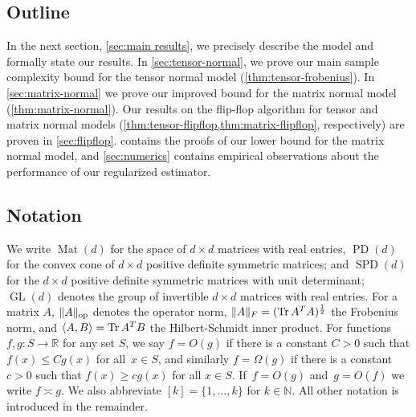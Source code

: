 \documentclass[aos]{imsart}
\theoremstyle{definition}
\numberwithin{equation}{section}
\DeclareMathOperator{\op}{op}
\DeclareMathOperator{\Mat}{Mat}
\DeclareMathOperator{\GL}{GL}
\DeclareMathOperator{\tr}{Tr}
\DeclareMathOperator{\PD}{PD}
\DeclareMathOperator{\SSPD}{SPD}
\DeclarePairedDelimiter{\abs}{\lvert}{\rvert}
\DeclarePairedDelimiter{\norm}{\lVert}{\rVert}
\newcommand{\R}{{\mathbb{R}}}
\newcommand{\N}{{\mathbb{N}}}
\newcommand{\MW}[1]{{\color{red}[MW: #1]}}
\newcommand{\MW}[1]{{}}
\begin{document}
\subsection{Outline}
In the next section, \cref{sec:main results}, we precisely describe the model and formally state our results.
In \cref{sec:tensor-normal}, we prove our main sample complexity bound for the tensor normal model (\cref{thm:tensor-frobenius}).
In \cref{sec:matrix-normal} we prove our improved bound for the matrix normal model (\cref{thm:matrix-normal}).
Our results on the flip-flop algorithm for tensor and matrix normal models (\cref{thm:tensor-flipflop,thm:matrix-flipflop}, respectively) are proven in \cref{sec:flipflop}.
 contains the proofs of our lower bound for the matrix normal model, and \cref{sec:numerics} contains empirical observations about the performance of our regularized estimator.

\subsection{Notation}
We write $\Mat(d)$ for the space of $d\times d$ matrices with real entries, $\PD(d)$ for the convex cone of $d\times d$ positive definite symmetric matrices; and $\SSPD(d)$ for the $d\times d$ positive definite symmetric matrices with unit determinant; $\GL(d)$ denotes the group of invertible $d\times d$ matrices with real entries.
For a matrix $A$, $\norm{A}_{\op}$ denotes the operator norm, $\norm{A}_F = (\tr A^T A)^{\frac12}$ the Frobenius norm, and $\braket{A,B} = \tr A^T B$ the Hilbert-Schmidt inner product.
For functions $f,g\colon S \to \R$ for any set $S$, we say $f = O(g)$ if there is a constant $C > 0$ such that $f(x) \leq C g(x)$ for all~$x \in S$, and similarly $f = \Omega(g)$ if there is a constant $c > 0$ such that $f(x) \geq c g(x)$ for all $x \in S$.
If~$f = O(g)$ and~$g = O(f)$ we write $f \asymp g$.
We also abbreviate $[k]=\{1,\dots,k\}$ for $k\in\N$.
All other notation is introduced in the remainder.
\end{document}
